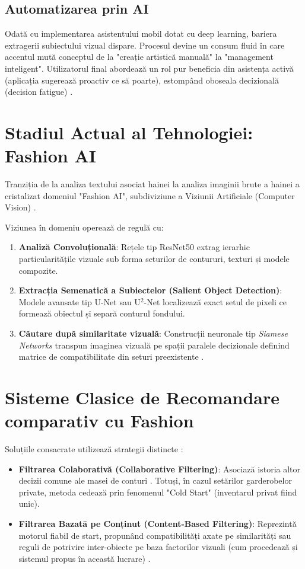 \subsection{Automatizarea prin AI}
Odată cu implementarea asistentului mobil dotat cu deep learning, bariera extragerii subiectului vizual dispare. Procesul devine un consum fluid în care accentul mută conceptul de la "creație artistică manuală" la "management inteligent". Utilizatorul final abordează un rol pur beneficia din asistența activă (aplicația sugerează proactiv ce să poarte), estompând oboseala decizională (decision fatigue) \cite{fashion_ai_review}.

\section{Stadiul Actual al Tehnologiei: Fashion AI}
Tranziția de la analiza textului asociat hainei la analiza imaginii brute a hainei a cristalizat domeniul "Fashion AI", subdiviziune a Viziunii Artificiale (Computer Vision) \cite{fashion_ai_review}.

Viziunea în domeniu operează de regulă cu:
\begin{enumerate}
    \item \textbf{Analiză Convoluțională}: Rețele tip ResNet50 \cite{he2016deep} extrag ierarhic particularitățile vizuale sub forma seturilor de contururi, texturi și modele compozite.
    \item \textbf{Extracția Semenatică a Subiectelor (Salient Object Detection)}: Modele avansate tip U-Net sau U$^2$-Net \cite{unet_original, qin2020u2net} localizează exact setul de pixeli ce formează obiectul și separă conturul fondului.
    \item \textbf{Căutare după similaritate vizuală}: Construcții neuronale tip \textit{Siamese Networks} transpun imaginea vizuală pe spații paralele decizionale definind matrice de compatibilitate din seturi preexistente \cite{chopra2005learning}.
\end{enumerate}

\section{Sisteme Clasice de Recomandare comparativ cu Fashion}
Soluțiile consacrate utilizează strategii distincte \cite{adomavicius2005toward}:
\begin{itemize}
    \item \textbf{Filtrarea Colaborativă (Collaborative Filtering)}: Asociază istoria altor decizii comune ale masei de conturi \cite{su2009survey}. Totuși, în cazul setărilor garderobelor private, metoda cedează prin fenomenul "Cold Start" (inventarul privat fiind unic).
    \item \textbf{Filtrarea Bazată pe Conținut (Content-Based Filtering)}: Reprezintă motorul fiabil de start, propunând compatibilități axate pe similarități sau reguli de potrivire inter-obiecte pe baza factorilor vizuali (cum procedează și sistemul propus în această lucrare) \cite{lops2011content}.
\end{itemize}


